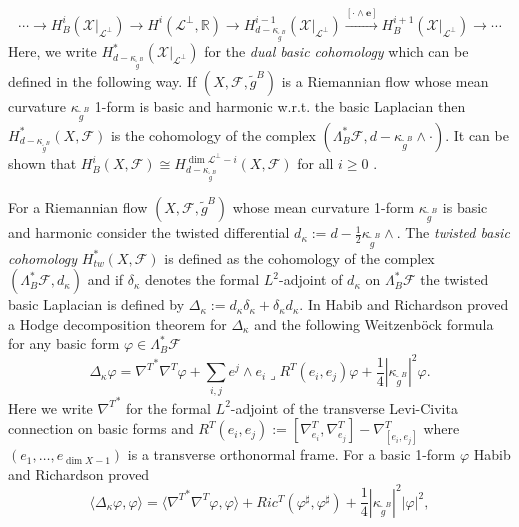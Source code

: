 \documentclass[a4paper,10pt,twoside]{amsart}
\theoremstyle{definition}
\theoremstyle{remark}
\numberwithin{equation}{section}
\begin{document}
\begin{equation*}
	\cdots \rightarrow H^{i}_{B}(\mathcal{X}|_{\mathcal{L}^{\perp}}) \rightarrow H^{i}(\mathcal{L}^{\perp},{\mathbb{R}}) \rightarrow
			H^{i-1}_{d-\kappa_{\tilde{g}^{B}}}(\mathcal{X}|_{\mathcal{L}^{\perp}}) \stackrel{[\cdot \wedge \mathbf{e}]}{\rightarrow}
				H^{i+1}_{B}(\mathcal{X}|_{\mathcal{L}^{\perp}}) \rightarrow \cdots
\end{equation*}
Here, we write $H^{*}_{d-\kappa_{\tilde{g}^{B}}}(\mathcal{X}|_{\mathcal{L}^{\perp}})$ for the {\em dual basic cohomology} which can be defined in
the following way. If $(X,\mathcal{F},\tilde{g}^{B})$ is a Riemannian flow whose mean curvature $\kappa_{\tilde{g}^{B}}$ 1-form is basic and
harmonic w.r.t. the basic Laplacian then $H^{*}_{d-\kappa_{\tilde{g}^{B}}}(X,\mathcal{F})$ is the cohomology of the complex
$(\Lambda_{B}^{*}\mathcal{F},d-\kappa_{\tilde{g}^{B}}\wedge \cdot)$. It can be shown that
$H^{i}_{B}(X,\mathcal{F}) \cong H^{\dim\mathcal{L}^{\perp} -i}_{d-\kappa_{\tilde{g}^{B}}}(X,\mathcal{F})$ for all
$i \geq 0$ \cite[Sec. 1.5]{habib-richardson-2010}.\par
For a Riemannian flow $(X,\mathcal{F},\tilde{g}^{B})$ whose mean curvature 1-form $\kappa_{\tilde{g}^{B}}$ is basic and harmonic consider the twisted
differential $d_{\kappa}:=d-\frac{1}{2}\kappa_{\tilde{g}^{B}}\wedge$. The {\em twisted basic cohomology} $H^{*}_{tw}(X,\mathcal{F})$ is defined as the
cohomology of the complex $(\Lambda_{B}^{*}\mathcal{F},d_{\kappa})$ and if $\delta_{\kappa}$ denotes the formal $L^{2}$-adjoint of $d_{\kappa}$ on
$\Lambda_{B}^{*}\mathcal{F}$ the twisted basic Laplacian is defined by $\Delta_{\kappa}:=d_{\kappa}\delta_{\kappa}+\delta_{\kappa}d_{\kappa}$. In
\cite{habib-richardson-2010} Habib and Richardson proved a Hodge decomposition theorem for $\Delta_{\kappa}$ and the following Weitzenb\"{o}ck formula
for any basic form $\varphi \in \Lambda_{B}^{*}\mathcal{F}$
\begin{equation*}
	\Delta_{\kappa} \varphi = {\nabla^{T}}^{*}\nabla^{T} \varphi + \sum_{i,j}{e^{j} \wedge e_{i} \lrcorner R^{T}(e_{i},e_{j})\varphi}
					+\frac{1}{4}|\kappa_{\tilde{g}^{B}}|^{2}\varphi.
\end{equation*}
Here we write ${\nabla^{T}}^{*}$ for the formal $L^{2}$-adjoint of the transverse Levi-Civita connection on basic forms and
$R^{T}(e_{i},e_{j}):=[\nabla^{T}_{e_{i}},\nabla^{T}_{e_{j}}]-\nabla^{T}_{[e_{i},e_{j}]}$ where $(e_{1},\ldots,e_{\dim X -1})$ is a transverse orthonormal
frame. For a basic 1-form $\varphi$ Habib and Richardson proved
\begin{equation*}
	{\langle{{\Delta_{\kappa}\varphi}},{{\varphi}}\rangle} = {\langle{{{\nabla^{T}}^{*}\nabla^{T}\varphi}},{{\varphi}}\rangle} + Ric^{T}(\varphi^{\sharp},\varphi^{\sharp})
							+\frac{1}{4}|\kappa_{\tilde{g}^{B}}|^{2}|\varphi|^{2},
\end{equation*}
\end{document}
